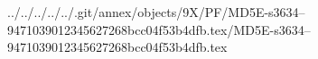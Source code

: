 ../../../../../.git/annex/objects/9X/PF/MD5E-s3634--9471039012345627268bcc04f53b4dfb.tex/MD5E-s3634--9471039012345627268bcc04f53b4dfb.tex
